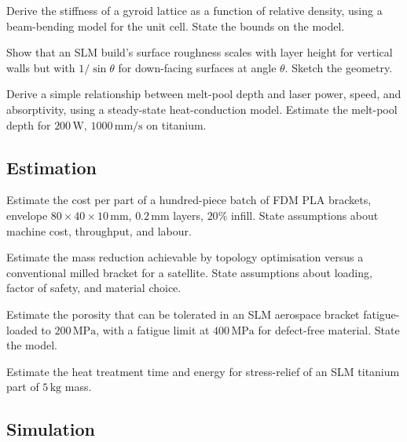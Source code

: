 \begin{exercise}
Derive the stiffness of a gyroid lattice as a function of relative density, using a beam-bending model for the unit cell. State the bounds on the model.
\end{exercise}

\begin{exercise}
Show that an SLM build's surface roughness scales with layer height for vertical walls but with $1/\sin\theta$ for down-facing surfaces at angle $\theta$. Sketch the geometry.
\end{exercise}

\begin{exercise}
Derive a simple relationship between melt-pool depth and laser power, speed, and absorptivity, using a steady-state heat-conduction model. Estimate the melt-pool depth for $200\,\text{W}$, $1000\,\text{mm/s}$ on titanium.
\end{exercise}

\subsection*{Estimation}

\begin{exercise}
Estimate the cost per part of a hundred-piece batch of FDM PLA brackets, envelope $80 \times 40 \times 10\,\text{mm}$, $0.2\,\text{mm}$ layers, $20\%$ infill. State assumptions about machine cost, throughput, and labour.
\end{exercise}

\begin{exercise}
Estimate the mass reduction achievable by topology optimisation versus a conventional milled bracket for a satellite. State assumptions about loading, factor of safety, and material choice.
\end{exercise}

\begin{exercise}
Estimate the porosity that can be tolerated in an SLM aerospace bracket fatigue-loaded to $200\,\text{MPa}$, with a fatigue limit at $400\,\text{MPa}$ for defect-free material. State the model.
\end{exercise}

\begin{exercise}
Estimate the heat treatment time and energy for stress-relief of an SLM titanium part of $5\,\text{kg}$ mass.
\end{exercise}

\subsection*{Simulation}

